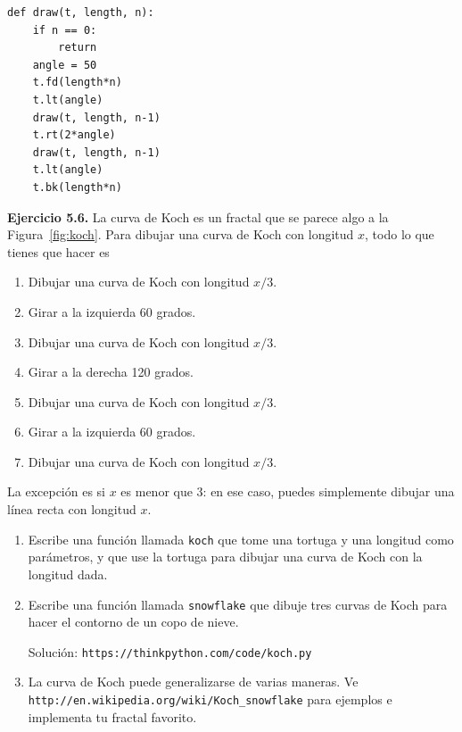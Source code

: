 \begin{lstlisting}
def draw(t, length, n):
    if n == 0:
        return
    angle = 50
    t.fd(length*n)
    t.lt(angle)
    draw(t, length, n-1)
    t.rt(2*angle)
    draw(t, length, n-1)
    t.lt(angle)
    t.bk(length*n)
\end{lstlisting}

\textbf{Ejercicio 5.6.} La curva de Koch es un fractal que se parece algo a la Figura~\ref{fig:koch}. Para dibujar una curva de Koch con longitud $x$, todo lo que tienes que hacer es

\begin{enumerate}
\item Dibujar una curva de Koch con longitud $x/3$.
\item Girar a la izquierda 60 grados.
\item Dibujar una curva de Koch con longitud $x/3$.
\item Girar a la derecha 120 grados.
\item Dibujar una curva de Koch con longitud $x/3$.
\item Girar a la izquierda 60 grados.
\item Dibujar una curva de Koch con longitud $x/3$.
\end{enumerate}

La excepción es si $x$ es menor que 3: en ese caso, puedes simplemente dibujar una línea recta con longitud $x$.

\begin{enumerate}
\item Escribe una función llamada \texttt{koch} que tome una tortuga y una longitud como parámetros, y que use la tortuga para dibujar una curva de Koch con la longitud dada.

\item Escribe una función llamada \texttt{snowflake} que dibuje tres curvas de Koch para hacer el contorno de un copo de nieve.

Solución: \texttt{https://thinkpython.com/code/koch.py}

\item La curva de Koch puede generalizarse de varias maneras. Ve \texttt{http://en.wikipedia.org/wiki/Koch\_snowflake} para ejemplos e implementa tu fractal favorito.
\end{enumerate}
